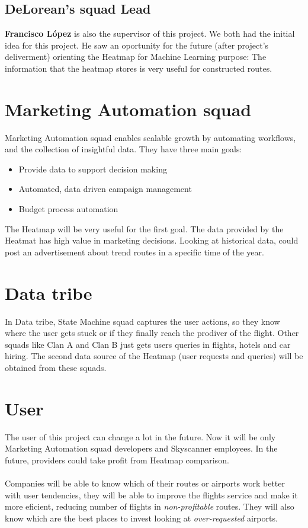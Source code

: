 \subsection*{DeLorean's squad Lead}

\textbf{Francisco López} is also the supervisor of this project. We both had the initial idea for this project. He saw an oportunity for the future (after project's deliverment) orienting the Heatmap for Machine Learning purpose: The information that the heatmap stores is very useful for constructed routes.


\section{Marketing Automation squad} \label{mas}

Marketing Automation squad enables scalable growth by automating workflows, and the collection of insightful data. They have three main goals:

\begin{itemize}
  \item Provide data to support decision making
  \item Automated, data driven campaign management
  \item Budget process automation
\end{itemize}

The Heatmap will be very useful for the first goal. The data provided by the Heatmat has high value in marketing decisions. Looking at historical data,  could post an advertisement about trend routes in a specific time of the year.

\section{Data tribe}

In Data tribe, State Machine squad captures the user actions, so they know where the user gets stuck or if they finally reach the prodiver of the flight. Other squads like Clan A and Clan B just gets users queries in flights, hotels and car hiring. The second data source of the Heatmap (user requests and queries) will be obtained from these squads.

\section{User}

The user of this project can change a lot in the future. Now it will be only Marketing Automation squad developers and Skyscanner employees. In the future, providers could take profit from Heatmap comparison.
\\\\
Companies will be able to know which of their routes or airports work better with user tendencies, they will be able to improve the flights service and make it more eficient, reducing number of flights in \textit{non-profitable} routes. They will also know which are the best places to invest looking at \textit{over-requested} airports.